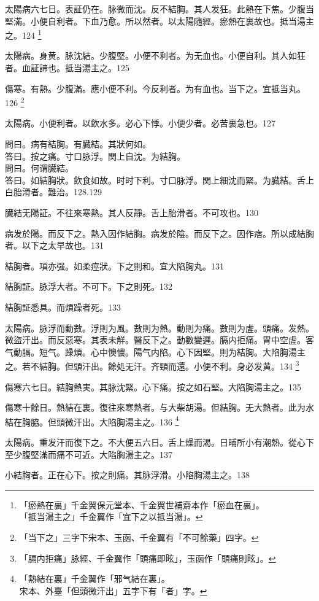 \documentclass[12pt,twoside,UTF8,b5paper]{ctexbook}
\begin{document}
太陽病六七日。表証仍在。脉微而沈。反不結胸。其人发狂。此熱在下焦。少腹当堅滿。小便自利者。下血乃愈。所以然者。以太陽隨經。瘀熱在裏故也。抵当湯主之。124
	\footnote{「瘀熱在裏」千金翼保元堂本、千金翼世補齋本作「瘀血在裏」。\\「抵当湯主之」千金翼作「宜下之以抵当湯」。}

太陽病。身黄。脉沈結。少腹堅。小便不利者。为无血也。小便自利。其人如狂者。血証諦也。抵当湯主之。125

傷寒。有熱。少腹滿。應小便不利。今反利者。为有血也。当下之。宜抵当丸。126
	\footnote{「当下之」三字下宋本、玉函、千金翼有「不可餘藥」四字。}

太陽病。小便利者。以飲水多。必心下悸。小便少者。必苦裏急也。127

問曰。病有結胸。有臓結。其狀何如。\\
答曰。按之痛。寸口脉浮。関上自沈。为結胸。\\
問曰。何谓臓結。\\
答曰。如結胸狀。飲食如故。时时下利。寸口脉浮。関上細沈而緊。为臓結。舌上白胎滑者。難治。128.129

臓結无陽証。不往來寒熱。其人反靜。舌上胎滑者。不可攻也。130

病发於陽。而反下之。熱入因作結胸。病发於陰。而反下之。因作痞。所以成結胸者。以下之太早故也。131

結胸者。項亦强。如柔痙狀。下之則和。宜大陷胸丸。131

結胸証。脉浮大者。不可下。下之則死。132

結胸証悉具。而煩躁者死。133

太陽病。脉浮而動數。浮則为風。數則为熱。動則为痛。數則为虗。頭痛。发熱。微盜汗出。而反惡寒。其表未觧。醫反下之。動數變遲。膈内拒痛。胃中空虗。客气動膈。短气。躁煩。心中懊憹。陽气内陷。心下因堅。則为結胸。大陷胸湯主之。若不結胸。但頭汗出。餘処无汗。齐頸而還。小便不利。身必发黄。134
	\footnote{「膈内拒痛」脉經、千金翼作「頭痛即眩」，玉函作「頭痛則眩」。}

傷寒六七日。結胸熱実。其脉沈緊。心下痛。按之如石堅。大陷胸湯主之。135

傷寒十餘日。熱結在裏。復往來寒熱者。与大柴胡湯。但結胸。无大熱者。此为水結在胸脇。{但}頭微汗出。大陷胸湯主之。136
	\footnote{「熱結在裏」千金翼作「邪气結在裏」。\\宋本、外臺「但頭微汗出」五字下有「者」字。}

太陽病。重发汗而復下之。不大便五六日。舌上燥而渴。日晡所小有潮熱。從心下至少腹堅滿而痛不可近。大陷胸湯主之。137

小結胸者。正在心下。按之則痛。其脉浮滑。小陷胸湯主之。138
\end{document}
